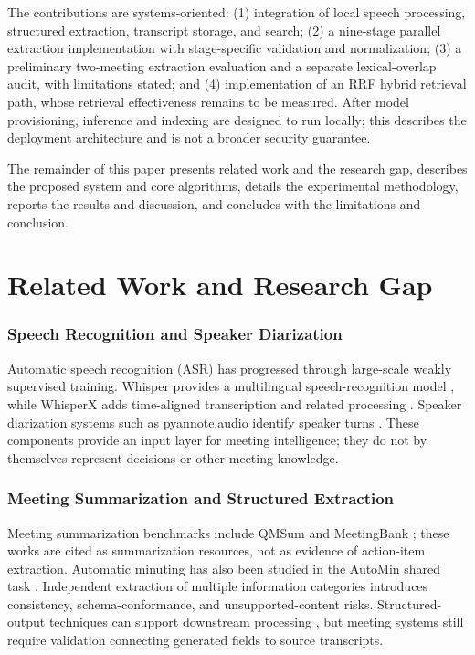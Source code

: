\documentclass[conference]{IEEEtran}
\begin{document}
The contributions are systems-oriented: (1) integration of local speech processing, structured extraction, transcript storage, and search; (2) a nine-stage parallel extraction implementation with stage-specific validation and normalization; (3) a preliminary two-meeting extraction evaluation and a separate lexical-overlap audit, with limitations stated; and (4) implementation of an RRF hybrid retrieval path, whose retrieval effectiveness remains to be measured. After model provisioning, inference and indexing are designed to run locally; this describes the deployment architecture and is not a broader security guarantee.

The remainder of this paper presents related work and the research gap, describes the proposed system and core algorithms, details the experimental methodology, reports the results and discussion, and concludes with the limitations and conclusion.

 

\section{Related Work and Research Gap}

\subsubsection{Speech Recognition and Speaker Diarization}

Automatic speech recognition (ASR) has progressed through large-scale weakly supervised training. Whisper provides a multilingual speech-recognition model \cite{whisper}, while WhisperX adds time-aligned transcription and related processing \cite{whisperx}. Speaker diarization systems such as pyannote.audio identify speaker turns \cite{pyannote}. These components provide an input layer for meeting intelligence; they do not by themselves represent decisions or other meeting knowledge.

\subsubsection{Meeting Summarization and Structured Extraction}

Meeting summarization benchmarks include QMSum \cite{qmsum} and MeetingBank \cite{meetingbank}; these works are cited as summarization resources, not as evidence of action-item extraction. Automatic minuting has also been studied in the AutoMin shared task \cite{automin}. Independent extraction of multiple information categories introduces consistency, schema-conformance, and unsupported-content risks. Structured-output techniques can support downstream processing \cite{jsonschema}, but meeting systems still require validation connecting generated fields to source transcripts.
\end{document}
